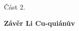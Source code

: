 \begin{center}
    \vspace*{1cm}
        \Huge
        Část 2.
        \vspace{8cm}

        
        {\fontsize{50}{50}\selectfont \textbf{Závěr Li Cu-quiánův }}
            
        \vspace{1.5cm}
        \thispagestyle{empty}
            

            
    \end{center}